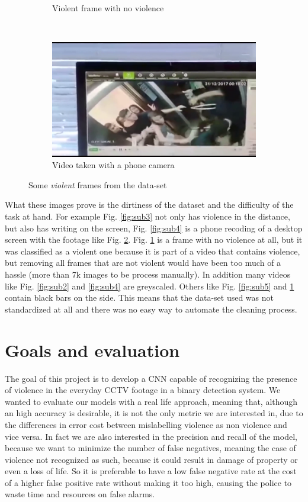 \begin{figure}[]
\begin{subfigure}{.5\textwidth}
        \caption{Violent frame with no violence}
        \label{fig:sub6}
    \end{subfigure}\\
    \begin{subfigure}{.5\textwidth}
        \centering
        \includegraphics[width=\linewidth]{./images/fi098-005.png}
        \caption{Video taken with a phone camera}
        \label{fig:sub7}
    \end{subfigure}
    \caption{Some \textit{violent} frames from the data-set}
    \label{fig:overall}
\end{figure}

What these images prove is the dirtiness of the dataset and the difficulty of the task at hand. For example Fig. \ref{fig:sub3} not only has violence in the distance, but also has writing on the screen, Fig. \ref{fig:sub4} is a phone recoding of a desktop screen with the footage like Fig. \ref{fig:sub7}. Fig. \ref{fig:sub6} is a frame with no violence at all, but it was classified as a violent one because it is part of a video that contains violence, but removing all frames that are not violent would have been too much of a hassle (more than 7k images to be process manually). In addition many videos like Fig. \ref{fig:sub2} and \ref{fig:sub4} are greyscaled. Others like Fig. \ref{fig:sub5} and \ref{fig:sub6} contain black bars on the side. This means that the data-set used was not standardized at all and there was no easy way to automate the cleaning process.

\section{Goals and evaluation}
The goal of this project is to develop a CNN capable of recognizing the presence of violence in the everyday CCTV footage in a binary detection system. We wanted to evaluate our models with a real life approach, meaning that, although an high accuracy is desirable, it is not the only metric we are interested in, due to the differences in error cost between mislabelling violence as non violence and vice versa. In fact we are also interested in the precision and recall of the model, because we want to minimize the number of false negatives, meaning the case of violence not recognized as such, because it could result in damage of property or even a loss of life. So it is preferable to have a low false negative rate at the cost of a higher false positive rate without making it too high, causing the police to waste time and resources on false alarms. 
